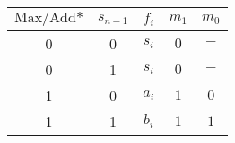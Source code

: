 \begin{tabular}{cc|c|cc}
$\mbox{Max/Add*}$&$s_{n-1}$&$f_i$&$m_1$&$m_0$\\\hline
0&0&$s_i$&$0$&$-$\\
0&1&$s_i$&$0$&$-$\\
1&0&$a_i$&$1$&$0$\\
1&1&$b_i$&$1$&$1$
\end{tabular}
